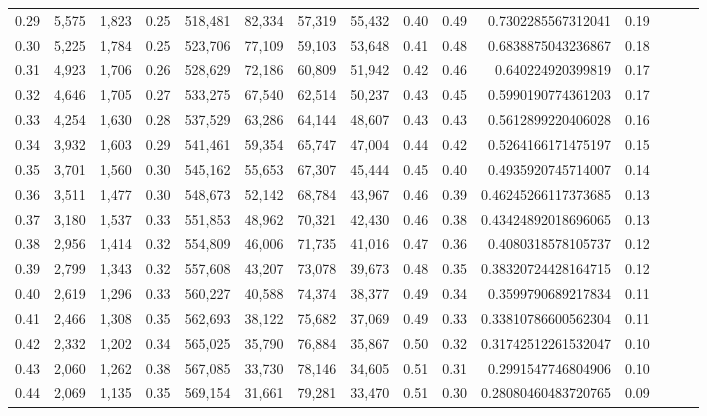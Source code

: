 \begin{tabular}{rrrrrrrrrrrrrrr}
0.29 &   5,575 &  1,823 &  0.25 &  518,481 &   82,334 &   57,319 &   55,432 &  0.40 &  0.49 &     0.7302285567312041 &      0.19 \\
0.30 &   5,225 &  1,784 &  0.25 &  523,706 &   77,109 &   59,103 &   53,648 &  0.41 &  0.48 &     0.6838875043236867 &      0.18 \\
0.31 &   4,923 &  1,706 &  0.26 &  528,629 &   72,186 &   60,809 &   51,942 &  0.42 &  0.46 &      0.640224920399819 &      0.17 \\
0.32 &   4,646 &  1,705 &  0.27 &  533,275 &   67,540 &   62,514 &   50,237 &  0.43 &  0.45 &     0.5990190774361203 &      0.17 \\
0.33 &   4,254 &  1,630 &  0.28 &  537,529 &   63,286 &   64,144 &   48,607 &  0.43 &  0.43 &     0.5612899220406028 &      0.16 \\
0.34 &   3,932 &  1,603 &  0.29 &  541,461 &   59,354 &   65,747 &   47,004 &  0.44 &  0.42 &     0.5264166171475197 &      0.15 \\
0.35 &   3,701 &  1,560 &  0.30 &  545,162 &   55,653 &   67,307 &   45,444 &  0.45 &  0.40 &     0.4935920745714007 &      0.14 \\
0.36 &   3,511 &  1,477 &  0.30 &  548,673 &   52,142 &   68,784 &   43,967 &  0.46 &  0.39 &    0.46245266117373685 &      0.13 \\
0.37 &   3,180 &  1,537 &  0.33 &  551,853 &   48,962 &   70,321 &   42,430 &  0.46 &  0.38 &    0.43424892018696065 &      0.13 \\
0.38 &   2,956 &  1,414 &  0.32 &  554,809 &   46,006 &   71,735 &   41,016 &  0.47 &  0.36 &     0.4080318578105737 &      0.12 \\
0.39 &   2,799 &  1,343 &  0.32 &  557,608 &   43,207 &   73,078 &   39,673 &  0.48 &  0.35 &    0.38320724428164715 &      0.12 \\
0.40 &   2,619 &  1,296 &  0.33 &  560,227 &   40,588 &   74,374 &   38,377 &  0.49 &  0.34 &     0.3599790689217834 &      0.11 \\
0.41 &   2,466 &  1,308 &  0.35 &  562,693 &   38,122 &   75,682 &   37,069 &  0.49 &  0.33 &    0.33810786600562304 &      0.11 \\
0.42 &   2,332 &  1,202 &  0.34 &  565,025 &   35,790 &   76,884 &   35,867 &  0.50 &  0.32 &    0.31742512261532047 &      0.10 \\
0.43 &   2,060 &  1,262 &  0.38 &  567,085 &   33,730 &   78,146 &   34,605 &  0.51 &  0.31 &     0.2991547746804906 &      0.10 \\
0.44 &   2,069 &  1,135 &  0.35 &  569,154 &   31,661 &   79,281 &   33,470 &  0.51 &  0.30 &    0.28080460483720765 &      0.09 \\

\end{tabular}
